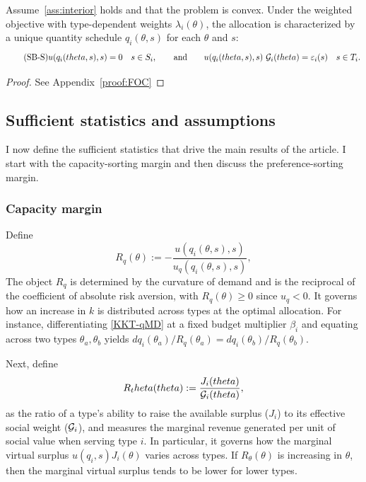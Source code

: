 \documentclass{class}
\begin{document}
\begin{lemma}\label{lem:FOC}
Assume~\ref{ass:interior} holds and that the problem is convex. Under the weighted objective with type-dependent weights $\lambda_i(\theta)$, the allocation is characterized by a unique quantity schedule $q_i(\theta,s)$ for each $\theta$ and $s$:
\[
\label{eq:SB-Smd1}\tag{SB-S}
u\!\left(q_i(theta,s),s\right)=0
\quad s\in S_i,
\qquad \text{and} \qquad
u\!\left(q_i(theta,s),s\right)\,\mathcal{G}_i(theta)=\varepsilon_i(s)
\quad s\in T_i.
\]
\end{lemma}
\begin{proof}
    See Appendix~\ref{proof:FOC}
\end{proof}

\subsection{Sufficient statistics and assumptions}\label{sec:suffstat}

I now define the sufficient statistics that drive the main results of the article. I start with the capacity-sorting margin and then discuss the preference-sorting margin.

\subsubsection{Capacity margin}

Define
\[
R_q(\theta):=-\frac{u\!\left(q_i(\theta,s),s\right)}{u_q\!\left(q_i(\theta,s),s\right)},
\]
The object $R_q$ is determined by the curvature of demand and is the reciprocal of the coefficient of absolute risk aversion, with $R_q(\theta)\geq 0$ since $u_q<0$. It governs how an increase in $k$ is distributed across types at the optimal allocation. For instance, differentiating \ref{KKT-qMD} at a fixed budget multiplier $\beta_i$ and equating across two types $\theta_a,\theta_b$ yields $dq_i(\theta_a)/R_q(\theta_a)=dq_i(\theta_b)/R_q(\theta_b)$. 

Next, define
\[
R_theta(theta):=\frac{J_i(theta)}{\mathcal{G}_i(theta)},
\]
as the ratio of a type's ability to raise the available surplus ($J_i$) to its effective social weight ($\mathcal{G}_i$), and measures the marginal revenue generated per unit of social value when serving type $i$. In particular, it governs how the marginal virtual surplus $u(q_i,s)J_i(\theta)$ varies across types. If $R_\theta(\theta)$ is increasing in $\theta$, then the marginal virtual surplus tends to be lower for lower types.
\end{document}
